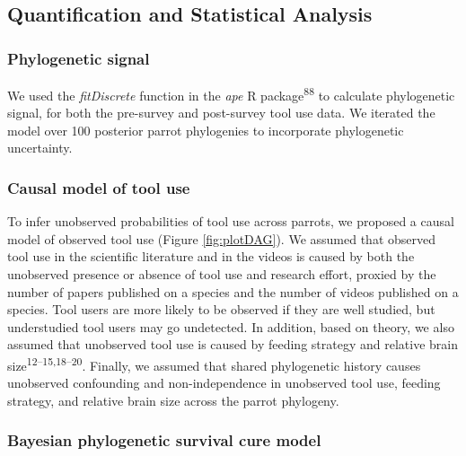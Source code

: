 \documentclass[
  man, donotrepeattitle,floatsintext]{apa6}
\begin{document}
\hypertarget{quantification-and-statistical-analysis}{%
\subsection{Quantification and Statistical Analysis}\label{quantification-and-statistical-analysis}}

\hypertarget{phylogenetic-signal}{%
\subsubsection{Phylogenetic signal}\label{phylogenetic-signal}}

We used the \emph{fitDiscrete} function in the \emph{ape} R package\textsuperscript{88} to
calculate phylogenetic signal, for both the pre-survey and post-survey tool use
data. We iterated the model over 100 posterior parrot phylogenies to incorporate
phylogenetic uncertainty.

\hypertarget{causal-model-of-tool-use}{%
\subsubsection{Causal model of tool use}\label{causal-model-of-tool-use}}

To infer unobserved probabilities of tool use across parrots, we proposed a
causal model of observed tool use (Figure \ref{fig:plotDAG}). We assumed that
observed tool use in the scientific literature and in the videos is caused by
both the unobserved presence or absence of tool use and research effort, proxied
by the number of papers published on a species and the number of videos
published on a species. Tool users are more likely to be observed if they are
well studied, but understudied tool users may go undetected. In addition, based
on theory, we also assumed that unobserved tool use is caused by feeding
strategy and relative brain size\textsuperscript{12--15,18--20}. Finally, we
assumed that shared phylogenetic history causes unobserved confounding and
non-independence in unobserved tool use, feeding strategy, and relative brain
size across the parrot phylogeny.

\hypertarget{bayesian-phylogenetic-survival-cure-model}{%
\subsubsection{Bayesian phylogenetic survival cure model}\label{bayesian-phylogenetic-survival-cure-model}}
\end{document}
